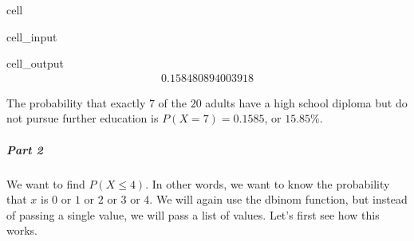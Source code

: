 \documentclass[letterpaper,10pt,english]{jupyterBook}
\begin{document}
\begin{sphinxuseclass}{cell}\begin{sphinxVerbatimInput}

\begin{sphinxuseclass}{cell_input}
\begin{sphinxVerbatim}[commandchars=\\\{\}]
\end{sphinxVerbatim}

\end{sphinxuseclass}\end{sphinxVerbatimInput}
\begin{sphinxVerbatimOutput}

\begin{sphinxuseclass}{cell_output}\begin{equation*}
\begin{split}0.158480894003918\end{split}
\end{equation*}
\end{sphinxuseclass}\end{sphinxVerbatimOutput}

\end{sphinxuseclass}
\sphinxAtStartPar
The probability that exactly \(7\) of the \(20\) adults have a high school diploma but do not pursue further education is \(P(X = 7) = 0.1585\), or \(15.85\%\).


\subparagraph{Part 2}
\label{\detokenize{Ch3 Probability/3.6 The Binomial Distribution:id5}}
\sphinxAtStartPar
We want to find \(P(X \leq 4)\). In other words, we want to know the probability that \(x\) is \(0\) or \(1\) or \(2\) or \(3\) or \(4\). We will again use the dbinom function, but instead of passing a single value, we will pass a list of values. Let’s first see how this works.
\end{document}
